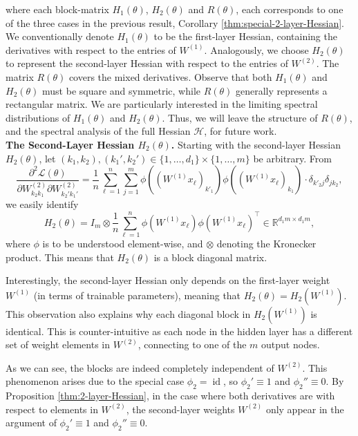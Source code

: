 \documentclass{article}
\begin{document}
where each block-matrix $H_1(\theta)$, $H_2(\theta)$ and $R(\theta)$, each corresponds to one of the three cases in the previous result, Corollary \ref{thm:special-2-layer-Hessian}. We conventionally denote $H_1(\theta)$ to be the first-layer Hessian, containing the derivatives with respect to the entries of $W^{(1)}$. Analogously, we choose $H_2(\theta)$ to represent the second-layer Hessian with respect to the entries of $W^{(2)}$. The matrix $R(\theta)$ covers the mixed derivatives. Observe that both $H_1(\theta)$ and $H_2(\theta)$ must be square and symmetric, while $R(\theta)$ generally represents a rectangular matrix. We are particularly interested in the limiting spectral distributions of $H_1(\theta)$ and $H_2(\theta)$. Thus, we will leave the structure of $R(\theta)$, and the spectral analysis of the full Hessian $\mathcal{H}$, for future work.
\bigskip
\bigskip
\\
\textbf{The Second-Layer Hessian $H_2(\theta)$.} Starting with the second-layer Hessian $H_2(\theta)$, let $(k_1,k_2),(k_1',k_2')\in\{1,\dots,d_1\}\times\{1,\dots,m\}$ be arbitrary. From
\begin{equation}
\frac{\partial^2\mathcal{L}(\theta)}{\partial W_{k_2k_1}^{(2)}\partial W_{k_2'k_1'}^{(2)}} = \frac{1}{n}\sum_{\ell=1}^n\sum_{j=1}^m\phi\left((W^{(1)}x_\ell)_{k'_1}\right)\phi\left((W^{(1)}x_\ell)_{k_1}\right)\cdot\delta_{k'_2j}\delta_{jk_2},
\end{equation}
we easily identify
\begin{equation}
H_2(\theta)=I_m\otimes\frac{1}{n}\sum_{\ell=1}^n\phi(W^{(1)}x_\ell)\phi(W^{(1)}x_\ell)^\top\in\mathbb{R}^{d_1m\times d_1m},
\end{equation}
where $\phi$ is to be understood element-wise, and $\otimes$ denoting the Kronecker product. This means that $H_2(\theta)$ is a block diagonal matrix.
\bigskip
\par
Interestingly, the second-layer Hessian only depends on the first-layer weight $W^{(1)}$ (in terms of trainable parameters), meaning that $H_2(\theta)=H_2(W^{(1)})$. This observation also explains why each diagonal block in $H_2(W^{(1)})$ is identical. This is counter-intuitive as each node in the hidden layer has a different set of weight elements in $W^{(2)}$, connecting to one of the $m$ output nodes. 
\par
As we can see, the blocks are indeed completely independent of $W^{(2)}$. This phenomenon arises due to the special case $\phi_2=\operatorname{id}$, so $\phi_2'\equiv 1$ and $\phi_2''\equiv 0$. By Proposition \ref{thm:2-layer-Hessian}, in the case where both derivatives are with respect to elements in $W^{(2)}$, the second-layer weights $W^{(2)}$ only appear in the argument of $\phi_2'\equiv 1$ and $\phi_2''\equiv 0$.
\end{document}
